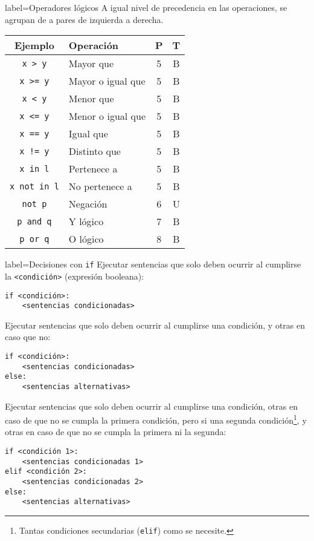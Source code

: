 \begin{contentbox}{label=Operadores lógicos}
    A igual nivel de precedencia en las operaciones, se agrupan de a pares de izquierda a derecha.

    \begin{center}
        \begin{tabular}{C|l|c|c}
            \textnormal{Ejemplo} & Operación & P & T \\
            \hline
            \lstinline!x > y! & Mayor que & 5 & B \\
            \lstinline!x >= y! & Mayor o igual que & 5 & B \\
            \lstinline!x < y! & Menor que & 5 & B \\
            \lstinline!x <= y! & Menor o igual que & 5 & B \\
            \lstinline!x == y! & Igual que & 5 & B \\
            \lstinline+x != y+ & Distinto que & 5 & B \\
            \lstinline!x in l! & Pertenece a & 5 & B \\
            \lstinline!x not in l! & No pertenece a & 5 & B \\
            \hline
            \lstinline!not p! & Negación & 6 & U \\
            \lstinline!p and q! & Y lógico & 7 & B \\
            \lstinline!p or q! & O lógico & 8 & B \\
            \hline
        \end{tabular}
    \end{center}
\end{contentbox}

\begin{contentbox}{label=Decisiones con \texttt{if}}
    Ejecutar sentencias que solo deben ocurrir al cumplirse la \lstinline!<condición>! (\alert{expresión booleana}):
\begin{lstlisting}
if <condición>:
    <sentencias condicionadas>
\end{lstlisting}

    Ejecutar sentencias que solo deben ocurrir al cumplirse una condición, y otras en caso que no:
\begin{lstlisting}
if <condición>:
    <sentencias condicionadas>
else:
    <sentencias alternativas>
\end{lstlisting}

    Ejecutar sentencias que solo deben ocurrir al cumplirse una condición, otras en caso de que no se cumpla la primera condición, pero si una segunda condición\footnote{Tantas condiciones secundarias (\lstinline!elif!) como se necesite.}, y otras en caso de que no se cumpla la primera ni la segunda:
\begin{lstlisting}
if <condición 1>:
    <sentencias condicionadas 1>
elif <condición 2>:
    <sentencias condicionadas 2>
else:
    <sentencias alternativas>
\end{lstlisting}
\end{contentbox}

